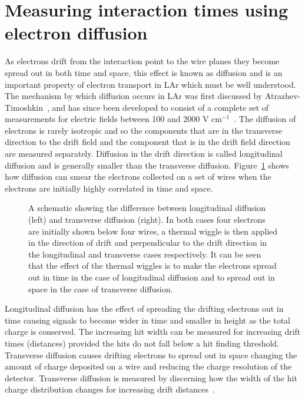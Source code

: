 \section{Measuring interaction times using electron diffusion}  \label{DiffusionAnalysis}%
As electrons drift from the interaction point to the wire planes they become spread out in both time and space, this effect is known as diffusion and is an important property of electron transport in LAr which must be well understood. The mechanism by which diffusion occurs in LAr was first discussed by Atrazhev-Timoshkin~\citep{Atrazhev-Timoshkin}, and has since been developed to consist of a complete set of measurements for electric fields between 100 and 2000 V cm$^{-1}$~\citep{Li:2015rqa}. The diffusion of electrons is rarely isotropic and so the components that are in the transverse direction to the drift field and the component that is in the drift field direction are measured separately. Diffusion in the drift direction is called longitudinal diffusion and is generally smaller than the transverse diffusion. Figure~\ref{fig:DomDiffSchem} shows how diffusion can smear the electrons collected on a set of wires when the electrons are initially highly correlated in time and space. \\

\begin{figure}[h!]
  \centering
  \caption[Schematic showing the process of diffusion]{A schematic showing the difference between longitudinal diffusion (left) and transverse diffusion (right). In both cases four electrons are initially shown below four wires, a thermal wiggle is then applied in the direction of drift and perpendicular to the drift direction in the longitudinal and transverse cases respectively. It can be seen that the effect of the thermal wiggles is to make the electrons spread out in time in the case of longitudinal diffusion and to spread out in space in the case of transverse diffusion\citep{DomSeptMeeting}.}
  \label{fig:DomDiffSchem}
\end{figure}

Longitudinal diffusion has the effect of spreading the drifting electrons out in time causing signals to become wider in time and smaller in height as the total charge is conserved. The increasing hit width can be measured for increasing drift times (distances) provided the hits do not fall below a hit finding threshold. Transverse diffusion causes drifting electrons to spread out in space changing the amount of charge deposited on a wire and reducing the charge resolution of the detector. Transverse diffusion is measured by discerning how the width of the hit charge distribution changes for increasing drift distances~\citep{DomSeptMeeting}. \\

